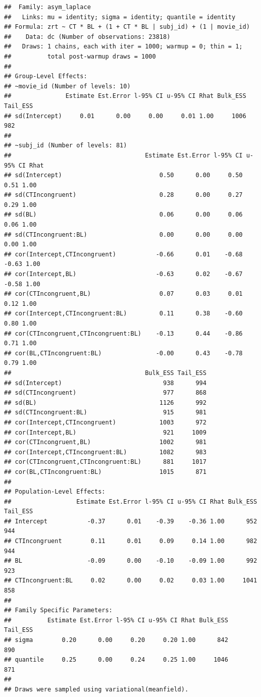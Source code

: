 \documentclass[
]{article}
\begin{document}
\begin{verbatim}
##  Family: asym_laplace 
##   Links: mu = identity; sigma = identity; quantile = identity 
## Formula: zrt ~ CT * BL + (1 + CT * BL | subj_id) + (1 | movie_id) 
##    Data: dc (Number of observations: 23818) 
##   Draws: 1 chains, each with iter = 1000; warmup = 0; thin = 1;
##          total post-warmup draws = 1000
## 
## Group-Level Effects: 
## ~movie_id (Number of levels: 10) 
##               Estimate Est.Error l-95% CI u-95% CI Rhat Bulk_ESS Tail_ESS
## sd(Intercept)     0.01      0.00     0.00     0.01 1.00     1006      982
## 
## ~subj_id (Number of levels: 81) 
##                                     Estimate Est.Error l-95% CI u-95% CI Rhat
## sd(Intercept)                           0.50      0.00     0.50     0.51 1.00
## sd(CTIncongruent)                       0.28      0.00     0.27     0.29 1.00
## sd(BL)                                  0.06      0.00     0.06     0.06 1.00
## sd(CTIncongruent:BL)                    0.00      0.00     0.00     0.00 1.00
## cor(Intercept,CTIncongruent)           -0.66      0.01    -0.68    -0.63 1.00
## cor(Intercept,BL)                      -0.63      0.02    -0.67    -0.58 1.00
## cor(CTIncongruent,BL)                   0.07      0.03     0.01     0.12 1.00
## cor(Intercept,CTIncongruent:BL)         0.11      0.38    -0.60     0.80 1.00
## cor(CTIncongruent,CTIncongruent:BL)    -0.13      0.44    -0.86     0.71 1.00
## cor(BL,CTIncongruent:BL)               -0.00      0.43    -0.78     0.79 1.00
##                                     Bulk_ESS Tail_ESS
## sd(Intercept)                            938      994
## sd(CTIncongruent)                        977      868
## sd(BL)                                  1126      992
## sd(CTIncongruent:BL)                     915      981
## cor(Intercept,CTIncongruent)            1003      972
## cor(Intercept,BL)                        921     1009
## cor(CTIncongruent,BL)                   1002      981
## cor(Intercept,CTIncongruent:BL)         1082      983
## cor(CTIncongruent,CTIncongruent:BL)      881     1017
## cor(BL,CTIncongruent:BL)                1015      871
## 
## Population-Level Effects: 
##                  Estimate Est.Error l-95% CI u-95% CI Rhat Bulk_ESS Tail_ESS
## Intercept           -0.37      0.01    -0.39    -0.36 1.00      952      944
## CTIncongruent        0.11      0.01     0.09     0.14 1.00      982      944
## BL                  -0.09      0.00    -0.10    -0.09 1.00      992      923
## CTIncongruent:BL     0.02      0.00     0.02     0.03 1.00     1041      858
## 
## Family Specific Parameters: 
##          Estimate Est.Error l-95% CI u-95% CI Rhat Bulk_ESS Tail_ESS
## sigma        0.20      0.00     0.20     0.20 1.00      842      890
## quantile     0.25      0.00     0.24     0.25 1.00     1046      871
## 
## Draws were sampled using variational(meanfield).
\end{verbatim}
\end{document}
